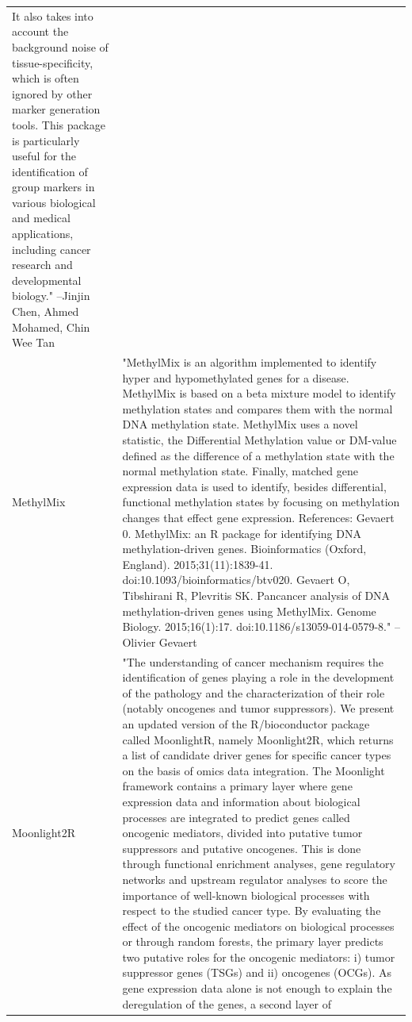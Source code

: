 \begin{longtable}[t]{l>{\raggedright\arraybackslash}p{25em}}
It also takes into account the background noise of
tissue-specificity, which is often ignored by other marker
generation tools. This package is particularly useful for the
identification of group markers in various biological and
medical applications, including cancer research and
developmental biology." --Jinjin Chen, Ahmed Mohamed, Chin Wee Tan\\
MethylMix & "MethylMix is an algorithm implemented to identify hyper
and hypomethylated genes for a disease. MethylMix is based on a
beta mixture model to identify methylation states and compares
them with the normal DNA methylation state. MethylMix uses a
novel statistic, the Differential Methylation value or DM-value
defined as the difference of a methylation state with the
normal methylation state. Finally, matched gene expression data
is used to identify, besides differential, functional
methylation states by focusing on methylation changes that
effect gene expression. References: Gevaert 0. MethylMix: an R
package for identifying DNA methylation-driven genes.
Bioinformatics (Oxford, England). 2015;31(11):1839-41.
doi:10.1093/bioinformatics/btv020. Gevaert O, Tibshirani R,
Plevritis SK. Pancancer analysis of DNA methylation-driven
genes using MethylMix. Genome Biology. 2015;16(1):17.
doi:10.1186/s13059-014-0579-8." --Olivier Gevaert\\
\addlinespace
Moonlight2R & "The understanding of cancer mechanism requires the
identification of genes playing a role in the development of
the pathology and the characterization of their role (notably
oncogenes and tumor suppressors). We present an updated version
of the R/bioconductor package called MoonlightR, namely
Moonlight2R, which returns a list of candidate driver genes for
specific cancer types on the basis of omics data integration.
The Moonlight framework contains a primary layer where gene
expression data and information about biological processes are
integrated to predict genes called oncogenic mediators, divided
into putative tumor suppressors and putative oncogenes. This is
done through functional enrichment analyses, gene regulatory
networks and upstream regulator analyses to score the
importance of well-known biological processes with respect to
the studied cancer type. By evaluating the effect of the
oncogenic mediators on biological processes or through random
forests, the primary layer predicts two putative roles for the
oncogenic mediators: i) tumor suppressor genes (TSGs) and ii)
oncogenes (OCGs). As gene expression data alone is not enough
to explain the deregulation of the genes, a second layer of

\end{longtable}
